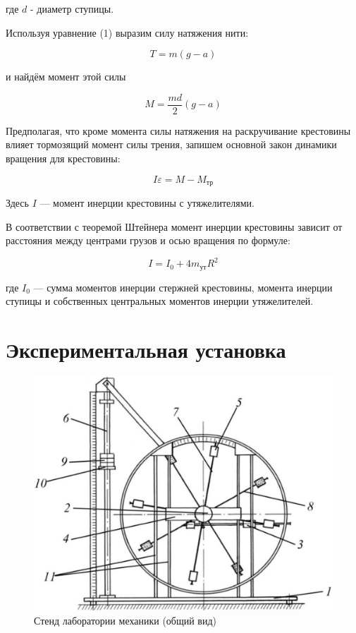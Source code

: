 \documentclass[a4paper]{article}
\begin{document}
где $d$ - диаметр ступицы.

Используя уравнение (1) выразим силу натяжения нити:


\begin{equation}
T = m(g - a)
\end{equation}

и найдём момент этой силы

\begin{equation}
M = \frac{md}{2}(g - a)
\end{equation}

Предполагая, что кроме момента силы натяжения на раскручивание крестовины влияет тормозящий момент силы трения, запишем основной закон динамики вращения для крестовины:

\begin{equation}
I \varepsilon = M - M_{\text{тр}}
\end{equation}

Здесь $I$ — момент инерции крестовины с утяжелителями.

В соответствии с теоремой Штейнера момент инерции крестовины зависит от расстояния между центрами грузов и осью вращения по формуле:

\begin{equation}
I = I_0 + 4m_{\text{ут}}R^2
\end{equation}

где $I_0$ — сумма моментов инерции стержней крестовины, момента инерции ступицы и собственных центральных моментов инерции утяжелителей.



\section{Экспериментальная установка}

\begin{figure}[H]
	\centering
	\includegraphics[scale=0.5]{pick2.png}
	\caption{Стенд лаборатории механики (общий вид)}
\end{figure}
\end{document}
